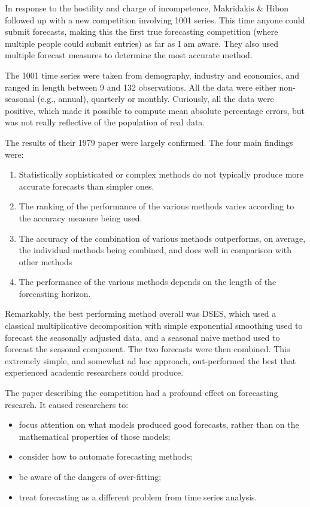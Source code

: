 \documentclass[11pt,a4paper,]{article}
\providecommand{\tightlist}{%
  \setlength{\itemsep}{0pt}\setlength{\parskip}{0pt}}
\begin{document}
In response to the hostility and charge of incompetence, Makridakis \& Hibon followed up with a new competition involving 1001 series. This time anyone could submit forecasts, making this the first true forecasting competition (where multiple people could submit entries) as far as I am aware. They also used multiple forecast measures to determine the most accurate method.

The 1001 time series were taken from demography, industry and economics, and ranged in length between 9 and 132 observations. All the data were either non-seasonal (e.g., annual), quarterly or monthly. Curiously, all the data were positive, which made it possible to compute mean absolute percentage errors, but was not really reflective of the population of real data.

The results of their 1979 paper were largely confirmed. The four main findings \autocite[taken from][]{Fildes1998} were:

\begin{enumerate}
\def\labelenumi{\arabic{enumi}.}
\tightlist
\item
  Statistically sophisticated or complex methods do not typically produce more accurate forecasts than simpler ones.
\item
  The ranking of the performance of the various methods varies according to the accuracy measure being used.
\item
  The accuracy of the combination of various methods outperforms, on average, the individual methods being combined, and does well in comparison with other methods
\item
  The performance of the various methods depends on the length of the forecasting horizon.
\end{enumerate}

Remarkably, the best performing method overall was DSES, which used a classical multiplicative decomposition \autocite{fpp2} with simple exponential smoothing used to forecast the seasonally adjusted data, and a seasonal naive method used to forecast the seasonal component. The two forecasts were then combined. This extremely simple, and somewhat ad hoc approach, out-performed the best that experienced academic researchers could produce.

The paper describing the competition \autocite{M1} had a profound effect on forecasting research. It caused researchers to:

\begin{itemize}
\tightlist
\item
  focus attention on what models produced good forecasts, rather than on the mathematical properties of those models;
\item
  consider how to automate forecasting methods;
\item
  be aware of the dangers of over-fitting;
\item
  treat forecasting as a different problem from time series analysis.
\end{itemize}
\end{document}
